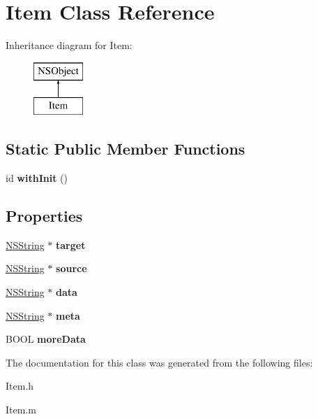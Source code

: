 \hypertarget{interface_item}{
\section{\-Item \-Class \-Reference}
\label{interface_item}
}
\-Inheritance diagram for \-Item\-:\begin{figure}[H]
\begin{center}
\leavevmode
\includegraphics[height=2.000000cm]{interface_item}
\end{center}
\end{figure}
\subsection*{\-Static \-Public \-Member \-Functions}
\begin{DoxyCompactItemize}
\item 
\hypertarget{interface_item_a9d87d1ebf041760e63fae33310428714}{
id {\bfseries with\-Init} ()}
\label{interface_item_a9d87d1ebf041760e63fae33310428714}

\end{DoxyCompactItemize}
\subsection*{\-Properties}
\begin{DoxyCompactItemize}
\item 
\hypertarget{interface_item_aa9822b98fc5ea5d34f926e82be1f5caf}{
\hyperlink{class_n_s_string}{\-N\-S\-String} $\ast$ {\bfseries target}}
\label{interface_item_aa9822b98fc5ea5d34f926e82be1f5caf}

\item 
\hypertarget{interface_item_a157430cb4306f46b8185fd247db6f83c}{
\hyperlink{class_n_s_string}{\-N\-S\-String} $\ast$ {\bfseries source}}
\label{interface_item_a157430cb4306f46b8185fd247db6f83c}

\item 
\hypertarget{interface_item_ae70e2d789c562082e1f52a5464d7aecc}{
\hyperlink{class_n_s_string}{\-N\-S\-String} $\ast$ {\bfseries data}}
\label{interface_item_ae70e2d789c562082e1f52a5464d7aecc}

\item 
\hypertarget{interface_item_a1b3bbe19a2503bd65797941738720e68}{
\hyperlink{class_n_s_string}{\-N\-S\-String} $\ast$ {\bfseries meta}}
\label{interface_item_a1b3bbe19a2503bd65797941738720e68}

\item 
\hypertarget{interface_item_ac2b17888a9e55c94063e9f47cc5d00cb}{
\-B\-O\-O\-L {\bfseries more\-Data}}
\label{interface_item_ac2b17888a9e55c94063e9f47cc5d00cb}

\end{DoxyCompactItemize}


\-The documentation for this class was generated from the following files\-:\begin{DoxyCompactItemize}
\item 
\-Item.\-h\item 
\-Item.\-m\end{DoxyCompactItemize}
